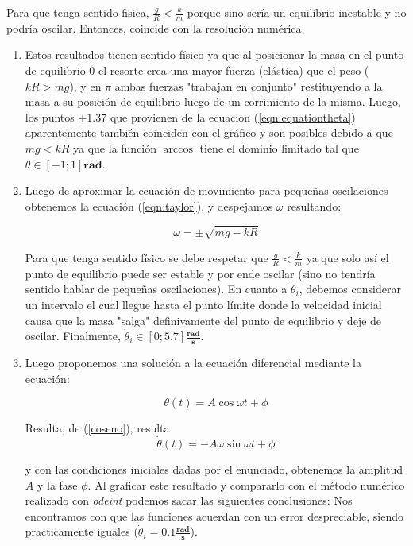 \documentclass{article}
\begin{document}
	Para que tenga sentido fisica, $\frac{g}{R} < \frac{k}{m}$ porque sino ser\'ia un equilibrio inestable y no podr\'ia oscilar. Entonces, coincide con la resoluci\'on num\'erica.
	
	\begin{enumerate}
		\item Estos resultados tienen sentido f\'isico ya que al posicionar la masa en el punto de equilibrio 0 el resorte crea una mayor fuerza (el\'astica) que el peso ($kR > mg$), y en $\pi$ ambas fuerzas "trabajan en conjunto" restituyendo a la masa a su posici\'on de equilibrio luego de un corrimiento de la misma. Luego, los puntos $\pm 1.37$ que provienen de la ecuacion (\ref{eqn:equationtheta}) aparentemente tambi\'en coinciden con el gr\'afico y son posibles debido a que $mg<kR$ ya que la funci\'on $\arccos{}$ tiene el dominio limitado tal que $\theta \in [-1;1] \textbf{rad}$.
		
		\item Luego de aproximar la ecuaci\'on de movimiento para peque\~nas oscilaciones obtenemos la ecuaci\'on (\ref{eqn:taylor}), y despejamos $\omega$ resultando:
		
		\begin{equation}
		\label{omega}
			\omega = \pm\sqrt{mg - kR}
		\end{equation}
		
		Para que tenga sentido f\'isico se debe respetar que $\frac{g}{R} < \frac{k}{m}$ ya que solo as\'i el punto de equilibrio puede ser estable y por ende oscilar (sino no tendr\'ia sentido hablar de peque\~nas oscilaciones). En cuanto a $\dot{\theta}_i$, debemos considerar un intervalo el cual llegue hasta el punto l\'imite donde la velocidad inicial causa que la masa "salga" definivamente del punto de equilibrio y deje de oscilar. Finalmente, $\dot{\theta}_i \in [0;5.7] \frac{\textbf{rad}}{\textbf{s}}$.
		
		\item Luego proponemos una soluci\'on a la ecuaci\'on diferencial mediante la ecuaci\'on:
		
		\begin{equation}
		\label{coseno}
			\theta(t) = A \cos{\omega t + \phi}
		\end{equation}
		
		Resulta, de (\ref{coseno}), resulta
			$$\dot{\theta}(t) = -A \omega \sin{\omega t + \phi}$$
			
		y con las condiciones iniciales dadas por el enunciado, obtenemos la amplitud $A$ y la fase $\phi$. Al graficar este resultado y compararlo con el m\'etodo num\'erico realizado con \emph{odeint} podemos sacar las siguientes conclusiones: Nos encontramos con que las funciones acuerdan con un error despreciable, siendo practicamente iguales ($\dot{\theta}_i = 0.1 \frac{\textbf{rad}}{\textbf{s}}$).
		

\end{enumerate}
\end{document}
